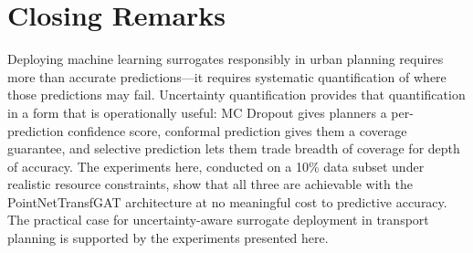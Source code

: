 \section{Closing Remarks}

Deploying machine learning surrogates responsibly in urban planning requires more than accurate predictions---it requires systematic quantification of where those predictions may fail. Uncertainty quantification provides that quantification in a form that is operationally useful: MC Dropout gives planners a per-prediction confidence score, conformal prediction gives them a coverage guarantee, and selective prediction lets them trade breadth of coverage for depth of accuracy. The experiments here, conducted on a 10\% data subset under realistic resource constraints, show that all three are achievable with the PointNetTransfGAT architecture at no meaningful cost to predictive accuracy. The practical case for uncertainty-aware surrogate deployment in transport planning is supported by the experiments presented here.

